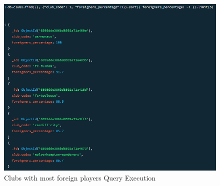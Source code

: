 \documentclass{Configuration_Files/PoliMi3i_thesis}
\begin{document}
\begin{figure}[htbp]
    \centering
    \includegraphics[scale=0.8]{Images/Queries/Clubs/Foreign_percentages/fp.png}
    \caption{Clubs with most foreign players Query Execution}
\end{figure}
\end{document}
